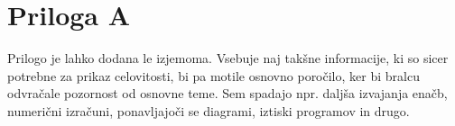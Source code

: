 \chapter{Priloga A}\label{cha:priloga}
Prilogo je lahko dodana le izjemoma. Vsebuje naj takšne informacije, ki so sicer potrebne za prikaz celovitosti, bi pa motile osnovno poročilo, ker bi bralcu odvračale pozornost od osnovne teme. Sem spadajo npr. daljša izvajanja enačb, numerični izračuni, ponavljajoči se diagrami, iztiski programov in drugo. 